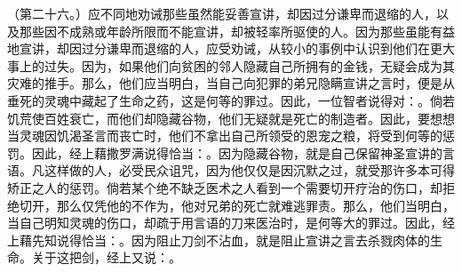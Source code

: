 \par

（第二十六。）应不同地劝诫那些虽然能妥善宣讲，却因过分谦卑而退缩的人，以及那些因不成熟或年龄所限而不能宣讲，却被轻率所驱使的人。因为那些虽能有益地宣讲，却因过分谦卑而退缩的人，应受劝诫，从较小的事例中认识到他们在更大事上的过失。因为，如果他们向贫困的邻人隐藏自己所拥有的金钱，无疑会成为其灾难的推手。那么，他们应当明白，当自己向犯罪的弟兄隐瞒宣讲之言时，便是从垂死的灵魂中藏起了生命之药，这是何等的罪过。因此，一位智者说得对：。倘若饥荒使百姓衰亡，而他们却隐藏谷物，他们无疑就是死亡的制造者。因此，要想想当灵魂因饥渴圣言而丧亡时，他们不拿出自己所领受的恩宠之粮，将受到何等的惩罚。因此，经上藉撒罗满说得恰当：。因为隐藏谷物，就是自己保留神圣宣讲的言语。凡这样做的人，必受民众诅咒，因为他仅仅是因沉默之过，就受那许多本可得矫正之人的惩罚。倘若某个绝不缺乏医术之人看到一个需要切开疗治的伤口，却拒绝切开，那么仅凭他的不作为，他对兄弟的死亡就难逃罪责。那么，他们当明白，当自己明知灵魂的伤口，却疏于用言语的刀来医治时，是何等大的罪过。因此，经上藉先知说得恰当：。因为阻止刀剑不沾血，就是阻止宣讲之言去杀戮肉体的生命。关于这把剑，经上又说：。\par

